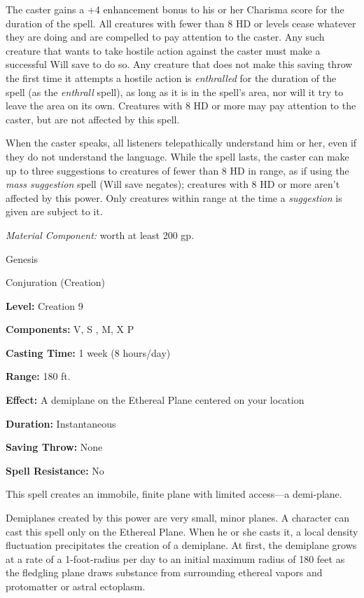 \documentclass{article}
\begin{document}
The caster gains a +4 enhancement bonus to his or her Charisma score for the duration 
of the spell. All creatures with fewer than 8 HD or levels cease whatever they 
are doing and are compelled to pay attention to the caster. Any such creature that 
wants to take hostile action against the caster must make a successful Will save 
to do so. Any creature that does not make this saving throw the first time it attempts 
a hostile action is \textit{enthralled }for the duration of the spell (as the \textit{enthrall 
}spell), as long as it is in the spell's area, nor will it try to leave the area 
on its own. Creatures with 8 HD or more may pay attention to the caster, but are 
not affected by this spell.

When the caster speaks, all listeners telepathically understand him or her, even 
if they do not understand the language. While the spell lasts, the caster can make 
up to three suggestions to creatures of fewer than 8 HD in range, as if using the 
\textit{mass suggestion }spell (Will save negates); creatures with 8 HD or more 
aren't affected by this power. Only creatures within range at the time a \textit{suggestion 
}is given are subject to it.

\textit{Material Component: }worth at least 200 gp.

\vspace{12pt}
Genesis

Conjuration (Creation)

\textbf{Level:} Creation 9

\textbf{Components:} V, S , M, X P

\textbf{Casting Time:} 1 week (8 hours/day)

\textbf{Range:} 180 ft.

\textbf{Effect:} A demiplane on the Ethereal Plane centered on your location

\textbf{Duration:} Instantaneous

\textbf{Saving Throw:} None

\textbf{Spell Resistance:} No

This spell creates an immobile, finite plane with limited access---a demi-plane.

Demiplanes created by this power are very small, minor planes. A character can 
cast this spell only on the Ethereal Plane. When he or she casts it, a local density 
fluctuation precipitates the creation of a demiplane. At first, the demiplane grows 
at a rate of a 1-foot-radius per day to an initial maximum radius of 180 feet as 
the fledgling plane draws substance from surrounding ethereal vapors and protomatter 
or astral ectoplasm.
\end{document}
